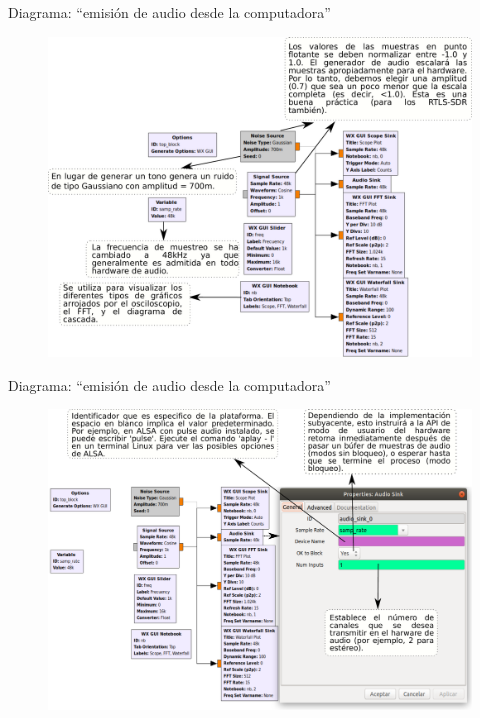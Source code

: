 \begin{frame}{Diagrama:  ``emisión de audio desde la computadora''}

\begin{figure}

\begin{center}
\vspace{-2mm}
    \includegraphics[width=.85\textwidth]{parte1/lab3/pdf/lab3_2.pdf}
\end{center}
\end{figure}

\end{frame}

\begin{frame}{Diagrama:  ``emisión de audio desde la computadora''}

\begin{figure}

\begin{center}
\vspace{-1mm}
\includegraphics[width=.92\textwidth]{parte1/lab3/pdf/lab3_3.pdf}
\end{center}
\end{figure}

\end{frame}

